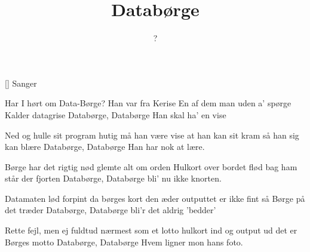 \documentclass[a4paper,11pt]{article}
\title{Databørge}
\author{?}
\begin{document}
\maketitle

\begin{roles}
[] Sanger
\end{roles}

\begin{song}
  Har I hørt om Data-Børge?
  Han var fra Kerise
  En af dem man uden a' spørge
  Kalder datagrise
  Databørge, Databørge
  Han skal ha' en vise

  Ned og hulle sit program
  hutig må han være
  vise at han kan sit kram
  så han sig kan blære
  Databørge, Databørge
  Han har nok at lære.

  Børge har det rigtig nød
  glemte alt om orden
  Hulkort over bordet flød
  bag ham står der fjorten
  Databørge, Databørge
  bli' nu ikke knorten.

  Datamaten lød forpint
  da børges kort den æder
  outputtet er ikke fint
  så Børge på det træder
  Databørge, Databørge
  bli'r det aldrig 'bedder'

  Rette fejl, men ej fuldtud
  nærmest som et lotto
  hulkort ind og output ud
  det er Børges motto
  Databørge, Databørge
  Hvem ligner mon hans foto.
\end{song}
\end{document}
